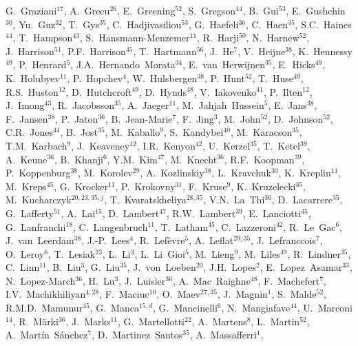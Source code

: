 \documentclass[12pt,a4paper]{article}
\def\Pc      {\ensuremath{\mathrm{c}}\xspace}
\def\Pc      {\ensuremath{c}\xspace}
\def\c     {\ensuremath{\Pc}\xspace}
\begin{document}
\begin{titlepage}
\begin{center}
\begin{flushleft}
G.~Graziani$^{17}$, 
A.~Grecu$^{26}$, 
E.~Greening$^{52}$, 
S.~Gregson$^{44}$, 
B.~Gui$^{53}$, 
E.~Gushchin$^{30}$, 
Yu.~Guz$^{32}$, 
T.~Gys$^{35}$, 
C.~Hadjivasiliou$^{53}$, 
G.~Haefeli$^{36}$, 
C.~Haen$^{35}$, 
S.C.~Haines$^{44}$, 
T.~Hampson$^{43}$, 
S.~Hansmann-Menzemer$^{11}$, 
R.~Harji$^{50}$, 
N.~Harnew$^{52}$, 
J.~Harrison$^{51}$, 
P.F.~Harrison$^{45}$, 
T.~Hartmann$^{56}$, 
J.~He$^{7}$, 
V.~Heijne$^{38}$, 
K.~Hennessy$^{49}$, 
P.~Henrard$^{5}$, 
J.A.~Hernando~Morata$^{34}$, 
E.~van~Herwijnen$^{35}$, 
E.~Hicks$^{49}$, 
K.~Holubyev$^{11}$, 
P.~Hopchev$^{4}$, 
W.~Hulsbergen$^{38}$, 
P.~Hunt$^{52}$, 
T.~Huse$^{49}$, 
R.S.~Huston$^{12}$, 
D.~Hutchcroft$^{49}$, 
D.~Hynds$^{48}$, 
V.~Iakovenko$^{41}$, 
P.~Ilten$^{12}$, 
J.~Imong$^{43}$, 
R.~Jacobsson$^{35}$, 
A.~Jaeger$^{11}$, 
M.~Jahjah~Hussein$^{5}$, 
E.~Jans$^{38}$, 
F.~Jansen$^{38}$, 
P.~Jaton$^{36}$, 
B.~Jean-Marie$^{7}$, 
F.~Jing$^{3}$, 
M.~John$^{52}$, 
D.~Johnson$^{52}$, 
C.R.~Jones$^{44}$, 
B.~Jost$^{35}$, 
M.~Kaballo$^{9}$, 
S.~Kandybei$^{40}$, 
M.~Karacson$^{35}$, 
T.M.~Karbach$^{9}$, 
J.~Keaveney$^{12}$, 
I.R.~Kenyon$^{42}$, 
U.~Kerzel$^{35}$, 
T.~Ketel$^{39}$, 
A.~Keune$^{36}$, 
B.~Khanji$^{6}$, 
Y.M.~Kim$^{47}$, 
M.~Knecht$^{36}$, 
R.F.~Koopman$^{39}$, 
P.~Koppenburg$^{38}$, 
M.~Korolev$^{29}$, 
A.~Kozlinskiy$^{38}$, 
L.~Kravchuk$^{30}$, 
K.~Kreplin$^{11}$, 
M.~Kreps$^{45}$, 
G.~Krocker$^{11}$, 
P.~Krokovny$^{31}$, 
F.~Kruse$^{9}$, 
K.~Kruzelecki$^{35}$, 
M.~Kucharczyk$^{20,23,35,j}$, 
T.~Kvaratskheliya$^{28,35}$, 
V.N.~La~Thi$^{36}$, 
D.~Lacarrere$^{35}$, 
G.~Lafferty$^{51}$, 
A.~Lai$^{15}$, 
D.~Lambert$^{47}$, 
R.W.~Lambert$^{39}$, 
E.~Lanciotti$^{35}$, 
G.~Lanfranchi$^{18}$, 
C.~Langenbruch$^{11}$, 
T.~Latham$^{45}$, 
C.~Lazzeroni$^{42}$, 
R.~Le~Gac$^{6}$, 
J.~van~Leerdam$^{38}$, 
J.-P.~Lees$^{4}$, 
R.~Lef\`{e}vre$^{5}$, 
A.~Leflat$^{29,35}$, 
J.~Lefran\c{c}ois$^{7}$, 
O.~Leroy$^{6}$, 
T.~Lesiak$^{23}$, 
L.~Li$^{3}$, 
L.~Li~Gioi$^{5}$, 
M.~Lieng$^{9}$, 
M.~Liles$^{49}$, 
R.~Lindner$^{35}$, 
C.~Linn$^{11}$, 
B.~Liu$^{3}$, 
G.~Liu$^{35}$, 
J.~von~Loeben$^{20}$, 
J.H.~Lopes$^{2}$, 
E.~Lopez~Asamar$^{33}$, 
N.~Lopez-March$^{36}$, 
H.~Lu$^{3}$, 
J.~Luisier$^{36}$, 
A.~Mac~Raighne$^{48}$, 
F.~Machefert$^{7}$, 
I.V.~Machikhiliyan$^{4,28}$, 
F.~Maciuc$^{10}$, 
O.~Maev$^{27,35}$, 
J.~Magnin$^{1}$, 
S.~Malde$^{52}$, 
R.M.D.~Mamunur$^{35}$, 
G.~Manca$^{15,d}$, 
G.~Mancinelli$^{6}$, 
N.~Mangiafave$^{44}$, 
U.~Marconi$^{14}$, 
R.~M\"{a}rki$^{36}$, 
J.~Marks$^{11}$, 
G.~Martellotti$^{22}$, 
A.~Martens$^{8}$, 
L.~Martin$^{52}$, 
A.~Mart\'{i}n~S\'{a}nchez$^{7}$, 
D.~Martinez~Santos$^{35}$, 
A.~Massafferri$^{1}$, 

\end{flushleft}
\end{center}
\end{titlepage}
\end{document}
